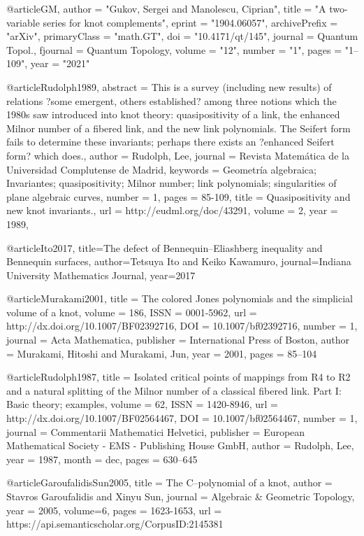@article{GM,
  author = "Gukov, Sergei and Manolescu, Ciprian",
  title = "{A two-variable series for knot complements}",
  eprint = "1904.06057",
  archivePrefix = "arXiv",
  primaryClass = "math.GT",
  doi = "10.4171/qt/145",
  journal = {Quantum Topol.},
  fjournal = {Quantum Topology},
  volume = "12",
  number = "1",
  pages = "1--109",
  year = "2021"
}

@article{Rudolph1989,
  abstract = {This is a survey (including new results) of relations ?some emergent, others established? among three notions which the 1980s saw introduced into knot theory: quasipositivity of a link, the enhanced Milnor number of a fibered link, and the new link polynomials. The Seifert form fails to determine these invariants; perhaps there exists an ?enhanced Seifert form? which does.},
  author = {Rudolph, Lee},
  journal = {Revista Matemática de la Universidad Complutense de Madrid},
  keywords = {Geometría algebraica; Invariantes; quasipositivity; Milnor number; link polynomials; singularities of plane algebraic curves},
  number = {1},
  pages = {85-109},
  title = {Quasipositivity and new knot invariants.},
  url = {http://eudml.org/doc/43291},
  volume = {2},
  year = {1989},
}

@article{Ito2017,
  title={The defect of Bennequin--Eliashberg inequality and Bennequin surfaces},
  author={Tetsuya Ito and Keiko Kawamuro},
  journal={Indiana University Mathematics Journal},
  year={2017}
}

@article{Murakami2001,
  title = {The colored Jones polynomials and the simplicial volume of a knot},
  volume = {186},
  ISSN = {0001-5962},
  url = {http://dx.doi.org/10.1007/BF02392716},
  DOI = {10.1007/bf02392716},
  number = {1},
  journal = {Acta Mathematica},
  publisher = {International Press of Boston},
  author = {Murakami,  Hitoshi and Murakami,  Jun},
  year = {2001},
  pages = {85--104}
}

@article{Rudolph1987,
  title = {Isolated critical points of mappings from R4 to R2 and a natural splitting of the {Milnor} number of a classical fibered link. Part I: Basic theory; examples},
  volume = {62},
  ISSN = {1420-8946},
  url = {http://dx.doi.org/10.1007/BF02564467},
  DOI = {10.1007/bf02564467},
  number = {1},
  journal = {Commentarii Mathematici Helvetici},
  publisher = {European Mathematical Society - EMS - Publishing House GmbH},
  author = {Rudolph,  Lee},
  year = {1987},
  month = dec,
  pages = {630--645}
}



@article{GaroufalidisSun2005,
  title = {The {C--polynomial} of a knot},
  author = {Stavros Garoufalidis and Xinyu Sun},
  journal = {Algebraic \& Geometric Topology},
  year = 2005,
  volume=6,
  pages = {1623-1653},
  url = {https://api.semanticscholar.org/CorpusID:2145381}
}

